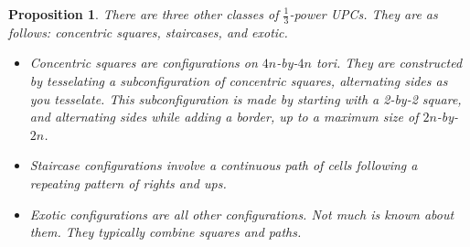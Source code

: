 \documentclass[12pt]{article}
\newtheorem{proposition}{Proposition}%
\theoremstyle{definition}
\theoremstyle{remark}
\theoremstyle{remark}
\begin{document}
\begin{proposition}
There are three other classes of $\frac{1}{3}$-power UPCs. They are as follows: concentric squares, \textit{staircases}, and exotic. \\
\begin{itemize}
  \item Concentric squares are configurations on $4n$-by-$4n$ tori. They are constructed by tesselating a subconfiguration of concentric squares, alternating sides as you tesselate. This subconfiguration is made by starting with a 2-by-2 square, and alternating sides while adding a border, up to a maximum size of $2n$-by-$2n$.
  \begin{figure}[H]
    \centering
  \end{figure}
  \item Staircase configurations involve a continuous path of cells following a repeating pattern of \emph{rights} and \emph{ups}.
  \begin{figure}[H]
    \centering
  \end{figure}
  \item Exotic configurations are all other configurations. Not much is known about them. They typically combine squares and paths.
  \begin{figure}[H]
    \centering
  \end{figure}
\end{itemize}

\end{proposition}
\end{document}
